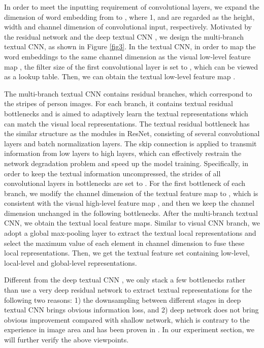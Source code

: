 \documentclass[review]{elsarticle}
\begin{document}
In order to meet the inputting requirement of convolutional layers, we expand the dimension of word embedding from  to , where 1,  and  are regarded as the height, width and channel dimension of convolutional input, respectively. Motivated by the residual network \cite{47} and the deep textual CNN \cite{12}, we design the multi-branch textual CNN, as shown in Figure \ref{fig3}. In the textual CNN, in order to map the word embeddings to the same channel dimension as the visual low-level feature map , the filter size of the first convolutional layer is set to , which can be viewed as a lookup table. Then, we can obtain the textual low-level feature map . 

The multi-branch textual CNN contains  residual branches, which correspond to the  stripes of person images. For each branch, it contains  textual residual bottlenecks and is aimed to adaptively learn the textual representations which can match the visual local representations. The textual residual bottleneck has the similar structure as the modules in ResNet, consisting of several convolutional layers and batch normalization layers. The skip connection is applied to transmit information from low layers to high layers, which can effectively restrain the network degradation problem and speed up the model training. Specifically, in order to keep the textual information uncompressed,
the strides of all convolutional layers in bottlenecks are set to . 
For the first bottleneck of each branch, we modify the channel dimension of the textual feature map to , which is consistent with the visual high-level feature map , and then we keep the channel dimension unchanged in the following bottlenecks. After the multi-branch textual CNN, we obtain the textual local feature maps. Similar to visual CNN branch, we adopt a global max-pooling layer to extract the textual local representations and select the maximum value of each element in channel dimension to fuse these local representations. Then, we get the textual feature set  containing low-level, local-level and global-level representations.

Different from the deep textual CNN \cite{12}, we only stack a few bottlenecks rather than use a very deep residual network to extract textual representations for the following two reasons: 1) the downsampling between different stages in deep textual CNN brings obvious information loss, and 2) deep network does not bring obvious improvement compared with shallow network, which is contrary to the experience in image area and has been proven in \cite{50}. In our experiment section, we will further verify the above viewpoints.
\end{document}
